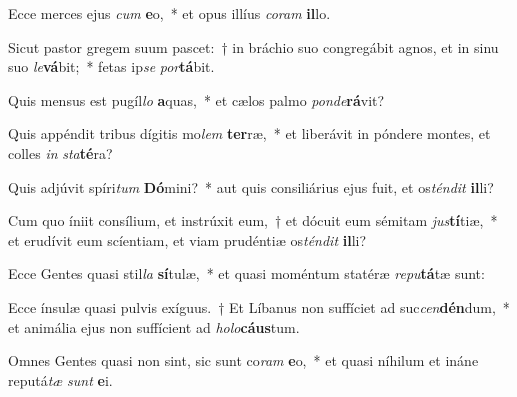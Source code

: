 \item Ecce merces ejus \textit{cum} \textbf{e}o,~* et opus illíus \textit{co}\textit{ram} \textbf{il}lo.
\item Sicut pastor gregem suum pascet:~† in bráchio suo congregábit agnos, et in sinu suo \textit{le}\textbf{vá}bit;~* fetas ip\textit{se} \textit{por}\textbf{tá}bit.
\item Quis mensus est pugíl\textit{lo} \textbf{a}quas,~* et cælos palmo \textit{pon}\textit{de}\textbf{rá}vit?
\item Quis appéndit tribus dígitis mo\textit{lem} \textbf{ter}ræ,~* et liberávit in póndere montes, et colles \textit{in} \textit{sta}\textbf{té}ra?
\item Quis adjúvit spíri\textit{tum} \textbf{Dó}mini?~* aut quis consiliárius ejus fuit, et os\textit{tén}\textit{dit} \textbf{il}li?
\item Cum quo íniit consílium, et instrúxit eum,~† et dócuit eum sémitam \textit{jus}\textbf{tí}tiæ,~* et erudívit eum scíentiam, et viam prudéntiæ os\textit{tén}\textit{dit} \textbf{il}li?
\item Ecce Gentes quasi stil\textit{la} \textbf{sí}tulæ,~* et quasi moméntum statéræ \textit{re}\textit{pu}\textbf{tá}tæ sunt:
\item Ecce ínsulæ quasi pulvis exíguus.~† Et Líbanus non suffíciet ad suc\textit{cen}\textbf{dén}dum,~* et animália ejus non suffícient ad \textit{ho}\textit{lo}\textbf{cáus}tum.
\item Omnes Gentes quasi non sint, sic sunt co\textit{ram} \textbf{e}o,~* et quasi níhilum et ináne reputá\textit{tæ} \textit{sunt} \textbf{e}i.
